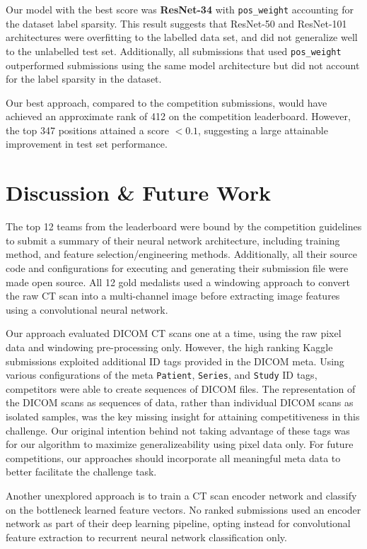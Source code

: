 \documentclass[runningheads]{llncs}
\begin{document}
Our model with the best score was \textbf{ResNet-34} with \texttt{pos\_weight} accounting for the dataset label sparsity.
This result suggests that ResNet-50 and ResNet-101 architectures were overfitting to the labelled data set, and did not generalize well to the unlabelled test set.
Additionally, all submissions that used \texttt{pos\_weight} outperformed submissions using the same model architecture but did not account for the label sparsity in the dataset.

Our best approach, compared to the competition submissions, would have achieved an approximate rank of 412 on the competition leaderboard.
However, the top 347 positions attained a score $< 0.1$, suggesting a large attainable improvement in test set performance.

\section{Discussion \& Future Work}
The top 12 teams from the leaderboard were bound by the competition guidelines to submit a summary of their neural network architecture, including training method, and feature selection/engineering methods.
Additionally, all their source code and configurations for executing and generating their submission file were made open source.
All 12 gold medalists used a windowing approach to convert the raw CT scan into a multi-channel image before extracting image features using a convolutional neural network.

Our approach evaluated DICOM CT scans one at a time, using the raw pixel data and windowing pre-processing only.
However, the high ranking Kaggle submissions exploited additional ID tags provided in the DICOM meta.
Using various configurations of the meta \texttt{Patient}, \texttt{Series}, and \texttt{Study} ID tags, competitors were able to create sequences of DICOM files.
The representation of the DICOM scans as sequences of data, rather than individual DICOM scans as isolated samples, was the key missing insight for attaining competitiveness in this challenge.
Our original intention behind not taking advantage of these tags was for our algorithm to maximize generalizeability using pixel data only.
For future competitions, our approaches should incorporate all meaningful meta data to better facilitate the challenge task.

Another unexplored approach is to train a CT scan encoder network and classify on the bottleneck learned feature vectors.
No ranked submissions used an encoder network as part of their deep learning pipeline, opting instead for convolutional feature extraction to recurrent neural network classification only.
\end{document}
